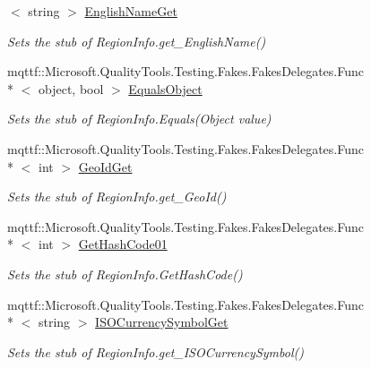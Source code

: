 \begin{DoxyCompactItemize}
$<$ string $>$ \hyperlink{class_system_1_1_globalization_1_1_fakes_1_1_stub_region_info_af0fc3198f8d182d2346e49431862ab09}{English\-Name\-Get}
\begin{DoxyCompactList}\small\item\em Sets the stub of Region\-Info.\-get\-\_\-\-English\-Name()\end{DoxyCompactList}\item 
mqttf\-::\-Microsoft.\-Quality\-Tools.\-Testing.\-Fakes.\-Fakes\-Delegates.\-Func\\*
$<$ object, bool $>$ \hyperlink{class_system_1_1_globalization_1_1_fakes_1_1_stub_region_info_a6b165db08b912fd6ae060db0f4f8e825}{Equals\-Object}
\begin{DoxyCompactList}\small\item\em Sets the stub of Region\-Info.\-Equals(\-Object value)\end{DoxyCompactList}\item 
mqttf\-::\-Microsoft.\-Quality\-Tools.\-Testing.\-Fakes.\-Fakes\-Delegates.\-Func\\*
$<$ int $>$ \hyperlink{class_system_1_1_globalization_1_1_fakes_1_1_stub_region_info_aff83be7a21cde8bcfd6e073f5b58f59d}{Geo\-Id\-Get}
\begin{DoxyCompactList}\small\item\em Sets the stub of Region\-Info.\-get\-\_\-\-Geo\-Id()\end{DoxyCompactList}\item 
mqttf\-::\-Microsoft.\-Quality\-Tools.\-Testing.\-Fakes.\-Fakes\-Delegates.\-Func\\*
$<$ int $>$ \hyperlink{class_system_1_1_globalization_1_1_fakes_1_1_stub_region_info_ac255f0b1586efbf0241351f569d49c70}{Get\-Hash\-Code01}
\begin{DoxyCompactList}\small\item\em Sets the stub of Region\-Info.\-Get\-Hash\-Code()\end{DoxyCompactList}\item 
mqttf\-::\-Microsoft.\-Quality\-Tools.\-Testing.\-Fakes.\-Fakes\-Delegates.\-Func\\*
$<$ string $>$ \hyperlink{class_system_1_1_globalization_1_1_fakes_1_1_stub_region_info_a6c340e979f4d639010b7b03918cf7651}{I\-S\-O\-Currency\-Symbol\-Get}
\begin{DoxyCompactList}\small\item\em Sets the stub of Region\-Info.\-get\-\_\-\-I\-S\-O\-Currency\-Symbol()\end{DoxyCompactList}\item 

\end{DoxyCompactItemize}
